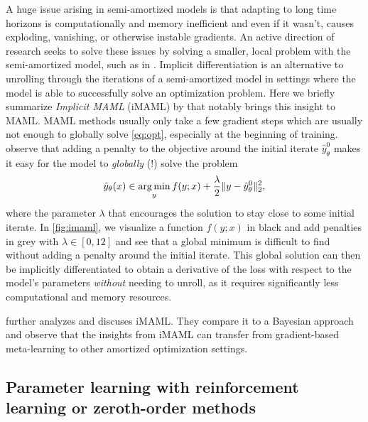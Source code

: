 \documentclass[twoside,11pt]{article}
\begin{document}
A huge issue arising in semi-amortized models is that adapting
to long time horizons is computationally and memory inefficient
and even if it wasn't, causes exploding, vanishing, or
otherwise instable gradients.
An active direction of research seeks to solve these issues by
solving a smaller, local problem with the semi-amortized model,
such as in \citet{chen2019modular,rajeswaran2019meta}.
Implicit differentiation is an alternative to unrolling through
the iterations of a semi-amortized model in settings where the
model is able to successfully solve an optimization problem.
Here we briefly summarize \emph{Implicit MAML} (iMAML) by \citet{rajeswaran2019meta}
that notably brings this insight to MAML.
MAML methods usually only take a few gradient steps which
are usually not enough to globally solve \cref{eq:opt},
especially at the beginning of training.
\citet{rajeswaran2019meta} observe that adding a penalty
to the objective around the initial iterate
$\hat y^0_\theta$ makes it easy for the model to
\emph{globally} (!) solve the problem
\begin{equation}
  \label{eq:iMAML}
  \hat y_\theta(x) \in \operatorname*{arg\,min}_y f(y; x) + \frac{\lambda}{2}\|y-\hat y^0_\theta\|_2^2,
\end{equation}
where the parameter $\lambda$ that encourages the
solution to stay close to some initial iterate.
In \cref{fig:imaml}, we visualize a function $f(y; x)$
in black and add penalties in grey with
$\lambda\in[0,12]$ and see that a global
minimum is difficult to find without adding a penalty
around the initial iterate.
This global solution can then be implicitly differentiated to obtain
a derivative of the loss with respect to the model's parameters
\emph{without} needing to unroll, as it requires
significantly less computational and memory resources.

\citet{huszar2019imaml} further analyzes and discuses iMAML.
They compare it to a Bayesian approach and observe that the insights
from iMAML can transfer from gradient-based meta-learning to
other amortized optimization settings.

\subsection{Parameter learning with reinforcement learning
  or zeroth-order methods}
\label{sec:learning:rl}
\end{document}
